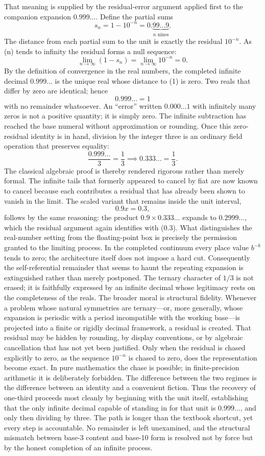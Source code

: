 That meaning is supplied by the residual-error argument applied first to the companion expansion \(0.999\ldots\). Define the partial sums
\[
s_n = 1 - 10^{-n} = 0.\underbrace{99\ldots9}_{n\text{ nines}}.
\]
The distance from each partial sum to the unit is exactly the residual \(10^{-n}\). As (n) tends to infinity the residual forms a null sequence:
\[
\lim_{n\to\infty}(1 - s_n) = \lim_{n\to\infty}10^{-n} = 0.
\]
By the definition of convergence in the real numbers, the completed infinite decimal \(0.999\ldots\) is the unique real whose distance to (1) is zero. Two reals that differ by zero are identical; hence
\[
0.999\ldots = 1
\]
with no remainder whatsoever. An “error” written \(0.000\ldots1\) with infinitely many zeros is not a positive quantity; it is simply zero. The infinite subtraction has reached the base numeral without approximation or rounding.
Once this zero-residual identity is in hand, division by the integer three is an ordinary field operation that preserves equality:
\[
\frac{0.999\ldots}{3} = \frac13 \implies 0.333\ldots = \frac13.
\]
The classical algebraic proof is thereby rendered rigorous rather than merely formal. The infinite tails that formerly appeared to cancel by fiat are now known to cancel because each contributes a residual that has already been shown to vanish in the limit. The scaled variant that remains inside the unit interval,
\[
0.9x = 0.3,
\]
follows by the same reasoning: the product \(0.9\times 0.333\ldots\) expands to \(0.2999\ldots\), which the residual argument again identifies with (0.3).
What distinguishes the real-number setting from the floating-point box is precisely the permission granted to the limiting process. In the completed continuum every place value \(b^{-k}\) tends to zero; the architecture itself does not impose a hard cut. Consequently the self-referential remainder that seems to haunt the repeating expansion is extinguished rather than merely postponed. The ternary character of \(1/3\) is not erased; it is faithfully expressed by an infinite decimal whose legitimacy rests on the completeness of the reals.
The broader moral is structural fidelity. Whenever a problem whose natural symmetries are ternary—or, more generally, whose expansion is periodic with a period incompatible with the working base—is projected into a finite or rigidly decimal framework, a residual is created. That residual may be hidden by rounding, by display conventions, or by algebraic cancellation that has not yet been justified. Only when the residual is chased explicitly to zero, as the sequence \(10^{-n}\) is chased to zero, does the representation become exact. In pure mathematics the chase is possible; in finite-precision arithmetic it is deliberately forbidden. The difference between the two regimes is the difference between an identity and a convenient fiction.
Thus the recovery of one-third proceeds most cleanly by beginning with the unit itself, establishing that the only infinite decimal capable of standing in for that unit is \(0.999\ldots\), and only then dividing by three. The path is longer than the textbook shortcut, yet every step is accountable. No remainder is left unexamined, and the structural mismatch between base-3 content and base-10 form is resolved not by force but by the honest completion of an infinite process.
